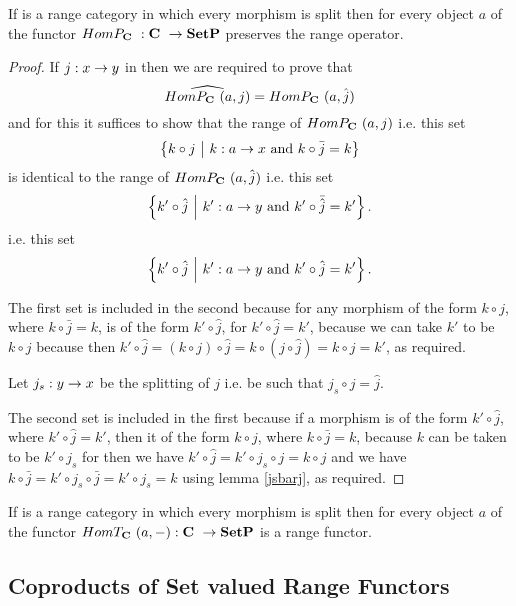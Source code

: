 \documentclass[10pt,a4paper]{article}
\theoremstyle{remark}
\begin{document}
\begin{lemma}
If \catcw is a range category in which every morphism is split then
for every object $a$ of \catcw the functor $HomP_{\textbf{C}}\ : \textbf{C}\  \rightarrow \textbf{SetP}$ preserves the range operator.
\end{lemma}
\begin{proof}
If $j: x \rightarrow y$ in \catcw then we are required to prove that
$$\widehat{HomP_{\textbf{C}}\ (a,j)}=HomP_{\textbf{C}}\ (a,\hat{j})$$
and for this it suffices to show that the range of $HomP_{\textbf{C}}\ (a,j)$ 
i.e. this set
$$\left\{ k \circ j \ \middle|\ k: a \rightarrow x \mbox{ and } k \circ \bar{j} = k \right\}$$ 
is identical to the range of $HomP_{\textbf{C}}\ (a,\hat{j})$ 
i.e. this set
$$\left\{k' \circ \hat{j} \ \middle|\ k':a \rightarrow y \mbox{ and } k' \circ \bar{\hat{j}} = k' \right\}.$$   
i.e. this set
$$\left\{k' \circ \hat{j} \ \middle|\ k':a \rightarrow y \mbox{ and } k' \circ \hat{j} = k' \right\}.$$

The first set is included in the second because for any morphism of the form $k \circ j$, 
where $k \circ \bar{j}=k$, 
is of the form $k' \circ \hat{j}$, for $k' \circ \hat{j} = k'$, 
because we can take $k'$ to be $k \circ j$ 
because then 
$k' \circ \hat{j} = (k \circ j) \circ \hat{j}= k \circ(j \circ \hat{j})= k \circ j = k'$,
as required. 

Let $j_s : y \rightarrow x$ be the splitting of $j$ i.e. be such that $j_s \circ j = \hat{j}$.

The second set is included in the first because if a morphism is of the form $k' \circ \hat{j}$, where $k' \circ \hat{j} = k'$, then it of the form $k \circ j$, where $k \circ \bar{j}=k$, because $k$ can be taken to be $k' \circ j_s$ for then we have 
$k' \circ \hat{j} = k' \circ j_s \circ j = k \circ j$
and we have $k \circ \bar{j}= k' \circ j_s \circ \bar{j} =  k' \circ j_s = k$ using lemma
\ref{jsbarj}, as required. 
 \end{proof}

\begin{corollary}
If \catcw is a range category in which every morphism is split then
for every object $a$ of \catcw the functor $HomT_{\textbf{C}}\ (a,-): \textbf{C}\  \rightarrow \textbf{SetP}$ is a range functor.
\end{corollary}

\subsection{Coproducts of Set valued Range Functors}
\newpage
\end{document}
